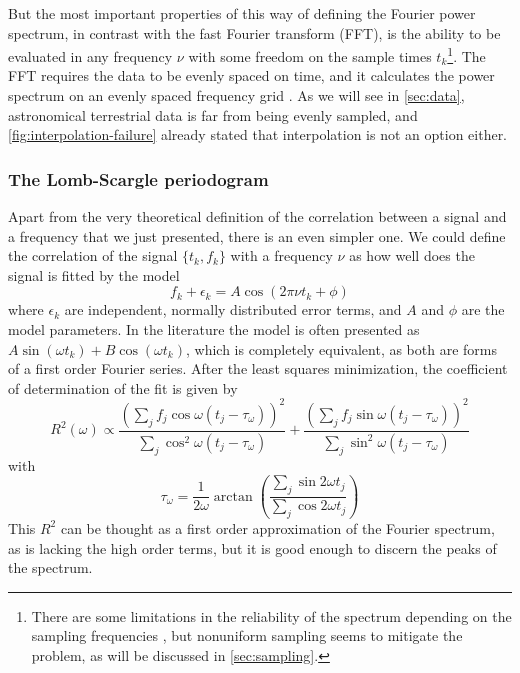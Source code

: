 	But the most important properties of this way of defining the Fourier power spectrum, in contrast with the fast Fourier transform (FFT),
	is the ability to be evaluated in any frequency $\nu$ with some freedom on the sample times $t_k$\footnote{
		There are some limitations in the reliability of the spectrum depending on the sampling frequencies \citep{Marvasti2001},
		but nonuniform sampling seems to mitigate the problem, as will be discussed in \autoref{sec:sampling}.
	}. 
	The FFT requires the data to be evenly spaced on time, and it calculates the power spectrum on an evenly spaced frequency grid \citep{Brigham1974}.
	As we will see in \autoref{sec:data}, astronomical terrestrial data is far from being evenly sampled, 
	and \autoref{fig:interpolation-failure} already stated that interpolation is not an option either.
	
	
	\subsubsection{The Lomb-Scargle periodogram}
	
	Apart from the very theoretical definition of the correlation between a signal and a frequency that we just presented,
	there is an even simpler one. We could define the correlation of the signal $\{t_k,f_k\}$ with a frequency $\nu$ as 
	how well does the signal is fitted by the model
	$$
	f_k + \epsilon_k = A \cos(2\pi \nu t_k +\phi)
	$$
	where $\epsilon_k$ are independent, normally distributed error terms, and $A$ and $\phi$ are the model parameters.
	In the literature the model is often presented as $A\sin(\omega t_k)+B\cos(\omega t_k)$, 
	which is completely equivalent, as both are forms of a first order Fourier series.
	After the least squares minimization, the coefficient of determination of the fit is given by \citep{Lomb1976,Scargle1982}
	\begin{equation}
		R^2(\omega) \propto \frac{\left(\sum_j f_j \cos\omega (t_j-\tau_\omega)\right)^2}{\sum_j \cos^2\omega(t_j-\tau_\omega)}+
		\frac{\left(\sum_j f_j \sin\omega (t_j-\tau_\omega)\right)^2}{\sum_j \sin^2\omega(t_j-\tau_\omega)} \label{eq:lomb-scargle}
	\end{equation}
	with
	\begin{equation}
		\tau_\omega = \frac{1}{2\omega}\arctan\left(\frac{\sum_j \sin 2 \omega t_j}{\sum_j \cos 2 \omega t_j}\right)  \label{eq:tau}
	\end{equation}
	This $R^2$ can be thought as a first order approximation of the Fourier spectrum, as is lacking the high order terms,
	but it is good enough to discern the peaks of the spectrum.
	
